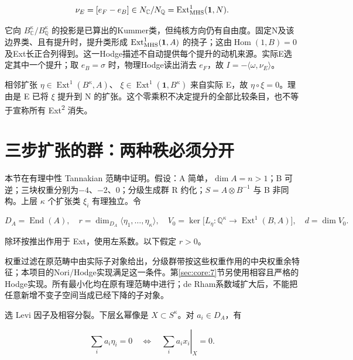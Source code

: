 \documentclass[11pt,a4paper,oneside]{ctexrep}
\theoremstyle{cnplain}
\theoremstyle{definition}
\theoremstyle{remark}
\begin{document}
\begin{equation}
\nu_E=[e_F-e_B]\in N_{\mathbb C}/N_{\mathbb Q}
       =\operatorname{Ext}^1_{\rm MHS}(\mathbf1,N).
\end{equation}

它向 \(B^\kappa_{\mathbb C}/B^\kappa_{\mathbb Q}\) 的投影是已算出的Kummer类，但纯核方向仍有自由度。固定N及该边界类、且有提升时，提升类形成 \(\operatorname{Ext}^1_{\rm MHS}(\mathbf1,A)\) 的挠子；这由\(\operatorname{Hom}(1,B)=0\)及Ext长正合列得到。这一Hodge描述不自动提供每个提升的动机来源。实际E选定其中一个提升；取 \(e_B=\sigma\) 时，物理Hodge读出消去 \(e_F\)，故 \(I=-\langle\omega,\nu_E\rangle\)。

相邻扩张 \(\eta\in\operatorname{Ext}^1(B^\kappa,A)\)、 \(\xi\in\operatorname{Ext}^1(\mathbf1,B^\kappa)\) 来自实际 E，故 \(\eta\circ\xi=0\)。理由是 E 已将 \(\xi \) 提升到 N 的扩张。这个零乘积不决定提升的全部比较条目，也不等于宣称所有 Ext\textsuperscript{2} 消失。

\section{三步扩张的群：两种秩必须分开}\label{sec:core:6}

本节在有理中性 Tannakian 范畴中证明。假设：A 简单，\(\dim A=n>1\)；B 可逆；三块权重分别为\(- 4\)、\(- 2\)、0；分级生成群 R 约化；\(S=A\otimes B^{-1}\) 与 B 非同构。上层 \(\kappa \) 个扩张类 \(\xi _i\) 有理独立。令

\begin{equation}
D_A=\operatorname{End}(A),\quad
 r=\dim_{D_A}\langle\eta_1,\ldots,\eta_\kappa\rangle,
 \quad V_0=\ker\bigl[L_\eta:\mathbb Q^\kappa\to
             \operatorname{Ext}^1(B,A)\bigr],\quad d=\dim V_0.  \label{eq:core:6.1}
\end{equation}

除环按推出作用于 Ext，使用左系数。以下假定 \(r>0\)。

权重过滤在原范畴中由实际子对象给出，分级群带按这些权重作用的中央权重余特征；本项目的Nori/Hodge实现满足这一条件。第\ref{sec:core:7}节另使用相容且严格的Hodge实现。所有最小化均在原有理范畴中进行；de Rham系数域扩大后，不能把任意新增不变子空间当成已经下降的子对象。

选 Levi 因子及相容分裂。下层幺幂像是 \(X\subset S^\kappa\)。对 \(a_i\in D_A\)，有

\begin{equation}
\sum_i a_i\eta_i=0
        \quad\Longleftrightarrow\quad
       \left.\sum_i a_ix_i\right|_X=0.                   \label{eq:core:6.2}
\end{equation}
\end{document}
